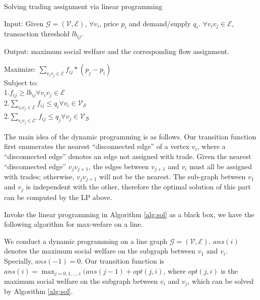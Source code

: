 \documentclass{aamas2015}
\begin{document}
\begin{algorithm}\label{alg:sol}
	\caption{Solving trading assignment via linear programming}
	Input:
	Given $\mathcal{G}=(\mathcal{V},\mathcal{E})$,
	$\forall v_i$, price $p_i$ and demand/supply $q_i$.
	$\forall v_iv_j\in \mathcal{E}$, transaction threshold $lb_{ij}$.
	
	Output: maximum social welfare and the corresponding flow assignment.
	
	Maximize: $\sum_{v_iv_j\in \mathcal{E}}f_{ij}*(p_j-p_i) $\\
	Subject to: \\
	1.$f_{ij}\geq lb_{ij} \forall v_iv_j\in \mathcal{E}$\\
	2.$\sum_{v_iv_j\in \mathcal{E}}f_{ij}\leq q_i \forall v_i\in \mathcal{V_S}$\\
	2.$\sum_{v_iv_j\in \mathcal{E}'}f_{ij}\leq q_j \forall v_j\in \mathcal{V_B}$\\
\end{algorithm}


The main idea of the dynamic programming is as follows.
Our transition function first enumerates the nearest ``disconnected edge'' of a vertex $v_i$, where a ``disconnected edge'' denotes an edge not assigned with trade.
Given the nearest ``disconnected edge'' $v_jv_{j+1}$, the edges between $v_{j+1}$ and $v_i$ must all be assigned with trades;  otherwise, $v_jv_{j+1}$ will not be the nearest.
The sub-graph between $v_1$ and $v_j$ is independent with the other, therefore the optimal solution of this part can be computed by the LP above.

Invoke the linear programming in Algorithm \ref{alg:sol} as a black box, we have the following algorithm for {\sc max-wefare} on a line.

We conduct a dynamic programming on a line graph $\mathcal{G}=(\mathcal{V},\mathcal{E})$.
$ans(i)$ denotes the maximum social welfare on the subgraph between $v_1$ and $v_i$.
Specially, $ans(-1)=0$.
Our transition function is $ans(i)=\max_{j=0,1,\ldots,i}(ans(j-1)+opt(j,i)$, where $opt(j,i)$ is the maximum social welfare on the subgraph between $v_i$ and $v_j$, which can be solved by Algorithm \ref{alg:sol}.
\end{document}
